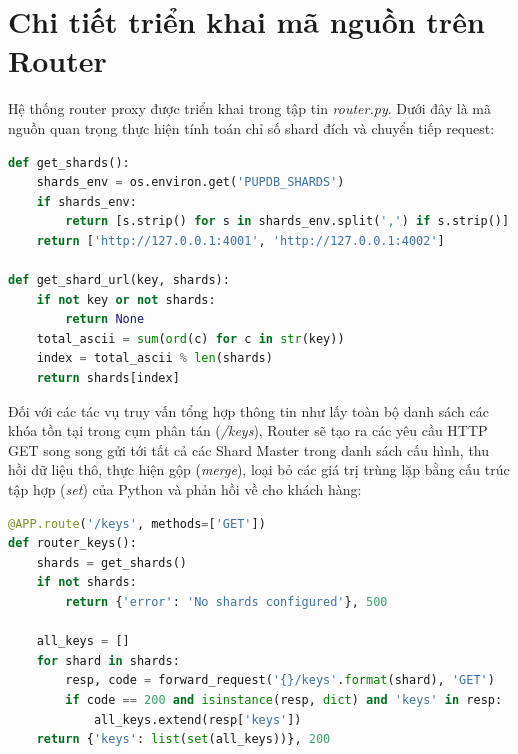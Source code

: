 \documentclass[12pt,a4paper]{report}
\begin{document}
\section{Chi tiết triển khai mã nguồn trên Router}
Hệ thống router proxy được triển khai trong tập tin \textit{router.py}. Dưới đây là mã nguồn quan trọng thực hiện tính toán chỉ số shard đích và chuyển tiếp request:

\begin{lstlisting}[language=Python, caption={Hàm định tuyến dữ liệu dựa trên tổng mã ASCII trong router.py}]
def get_shards():
    shards_env = os.environ.get('PUPDB_SHARDS')
    if shards_env:
        return [s.strip() for s in shards_env.split(',') if s.strip()]
    return ['http://127.0.0.1:4001', 'http://127.0.0.1:4002']

def get_shard_url(key, shards):
    if not key or not shards:
        return None
    total_ascii = sum(ord(c) for c in str(key))
    index = total_ascii % len(shards)
    return shards[index]
\end{lstlisting}

Đối với các tác vụ truy vấn tổng hợp thông tin như lấy toàn bộ danh sách các khóa tồn tại trong cụm phân tán (\textit{/keys}), Router sẽ tạo ra các yêu cầu HTTP GET song song gửi tới tất cả các Shard Master trong danh sách cấu hình, thu hồi dữ liệu thô, thực hiện gộp (\textit{merge}), loại bỏ các giá trị trùng lặp bằng cấu trúc tập hợp (\textit{set}) của Python và phản hồi về cho khách hàng:

\begin{lstlisting}[language=Python, caption={Hàm tổng hợp dữ liệu (Data Aggregation) cho Endpoint /keys}]
@APP.route('/keys', methods=['GET'])
def router_keys():
    shards = get_shards()
    if not shards:
        return {'error': 'No shards configured'}, 500

    all_keys = []
    for shard in shards:
        resp, code = forward_request('{}/keys'.format(shard), 'GET')
        if code == 200 and isinstance(resp, dict) and 'keys' in resp:
            all_keys.extend(resp['keys'])
    return {'keys': list(set(all_keys))}, 200
\end{lstlisting}
\end{document}
